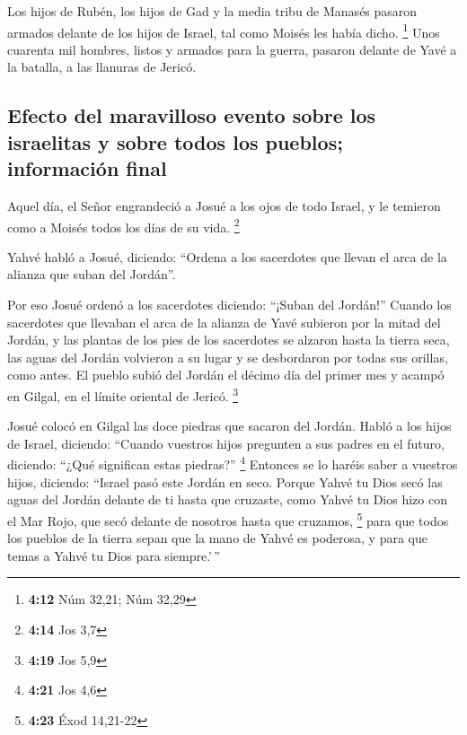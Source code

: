 \begin{paracol}{2}
 Los hijos de Rubén, los hijos de Gad y la media tribu de
Manasés pasaron armados delante de los hijos de Israel, tal como Moisés
les había dicho. \footnote{\textbf{4:12} Núm 32,21; Núm 32,29}
 Unos cuarenta mil hombres, listos y armados para la
guerra, pasaron delante de Yavé a la batalla, a las llanuras de Jericó.

\hypertarget{efecto-del-maravilloso-evento-sobre-los-israelitas-y-sobre-todos-los-pueblos-informaciuxf3n-final}{%
\subsection{Efecto del maravilloso evento sobre los israelitas y sobre
todos los pueblos; información
final}\label{efecto-del-maravilloso-evento-sobre-los-israelitas-y-sobre-todos-los-pueblos-informaciuxf3n-final}}

 Aquel día, el Señor engrandeció a Josué a los ojos de
todo Israel, y le temieron como a Moisés todos los días de su vida.
\footnote{\textbf{4:14} Jos 3,7}

 Yahvé habló a Josué, diciendo:  ``Ordena
a los sacerdotes que llevan el arca de la alianza que suban del
Jordán''.

 Por eso Josué ordenó a los sacerdotes diciendo: ``¡Suban
del Jordán!''  Cuando los sacerdotes que llevaban el arca
de la alianza de Yavé subieron por la mitad del Jordán, y las plantas de
los pies de los sacerdotes se alzaron hasta la tierra seca, las aguas
del Jordán volvieron a su lugar y se desbordaron por todas sus orillas,
como antes.  El pueblo subió del Jordán el décimo día del
primer mes y acampó en Gilgal, en el límite oriental de Jericó.
\footnote{\textbf{4:19} Jos 5,9}

 Josué colocó en Gilgal las doce piedras que sacaron del
Jordán.  Habló a los hijos de Israel, diciendo: ``Cuando
vuestros hijos pregunten a sus padres en el futuro, diciendo: ``¿Qué
significan estas piedras?'' \footnote{\textbf{4:21} Jos 4,6}
 Entonces se lo haréis saber a vuestros hijos, diciendo:
``Israel pasó este Jordán en seco.  Porque Yahvé tu Dios
secó las aguas del Jordán delante de ti hasta que cruzaste, como Yahvé
tu Dios hizo con el Mar Rojo, que secó delante de nosotros hasta que
cruzamos, \footnote{\textbf{4:23} Éxod 14,21-22}  para
que todos los pueblos de la tierra sepan que la mano de Yahvé es
poderosa, y para que temas a Yahvé tu Dios para siempre.'\,''


\end{paracol}
